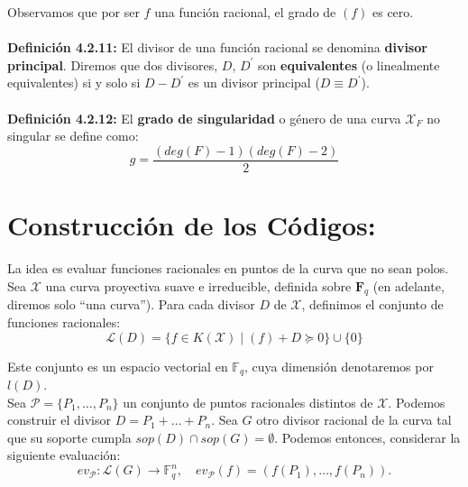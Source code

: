 \documentclass[11pt,spanish]{book}
\begin{document}
Observamos que por ser $f$ una función racional, el grado de $(f)$ es cero.\\
\\ \textbf{Definición 4.2.11: } El divisor de una función racional se denomina \textbf{divisor principal}. Diremos que dos divisores, $D$, $D^{'}$ son \textbf{equivalentes} (o linealmente equivalentes) si y solo si $D-D^{'}$ es un divisor principal ($D\equiv D^{'}$).\\
\\ \textbf{Definición 4.2.12:} El \textbf{grado de singularidad} o género de una curva $\mathbf{\mathcal{X}}_F$ no singular se define como:
$$g=\frac{(deg(F)-1)(deg(F)-2)}{2}$$
\section{Construcción de los Códigos:}
La idea es evaluar funciones racionales en puntos de la curva que no sean polos. Sea $\mathbf{\mathcal{X}}$ una curva proyectiva suave e irreducible, definida sobre $\mathbf{F}_q$ (en adelante, diremos solo ``una curva''). Para cada divisor $D$ de $\mathbf{\mathcal{X}}$, definimos el conjunto de funciones racionales:
$$\mathcal{L}(D)=\{f\in K(\mathbf{\mathcal{X}})\;|\; (f)+D\succeq 0\}\cup \{0\}$$

Este conjunto es un espacio vectorial en $\mathbb{F}_q$, cuya dimensión denotaremos por $l(D)$.\\
Sea $\mathcal{P}=\{P_1,\ldots,P_n\}$ un conjunto de puntos racionales distintos de $\mathbf{\mathcal{X}}$. Podemos construir el divisor $D=P_1+\ldots+P_n$. Sea $G$ otro divisor racional de la curva tal que su soporte cumpla $sop(D)\cap sop(G)=\emptyset$. Podemos entonces, considerar la \hypertarget{evP}{siguiente evaluación}:
$$ev_{\mathcal{P}}:\mathcal{L}(G)\longrightarrow \mathbb{F}_q^{n},\quad ev_{\mathcal{P}}(f)=(f(P_1),\ldots,f(P_n)).$$
\end{document}
